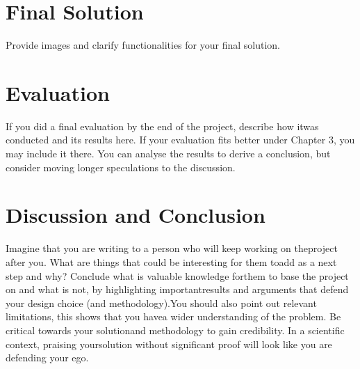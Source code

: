 \documentclass[a4paper, 11pt]{article}
\begin{document}
\section{Final Solution}
Provide images and clarify functionalities for your final solution.
\section{Evaluation}
If you did a final evaluation by the end of the project, describe how itwas conducted and its results here. If your evaluation fits better under Chapter 3, you may include it there. You can analyse the results to derive a conclusion, but consider moving longer speculations to the discussion.
\section{Discussion and Conclusion}
Imagine that you are writing to a person who will keep working on theproject after you. What are things that could be interesting for them toadd as a next step and why? Conclude what is valuable knowledge forthem to base the project on and what is not, by highlighting importantresults and arguments that defend your design choice (and methodology).You should also point out relevant limitations, this shows that you havea wider understanding of the problem. Be critical towards your solutionand methodology to gain credibility. In a scientific context, praising yoursolution without significant proof will look like you are defending your ego.

\end{document}
